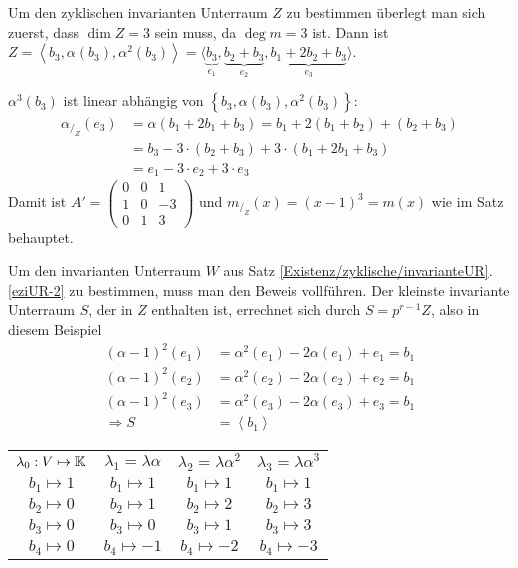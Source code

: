 Um den zyklischen invarianten Unterraum $Z$ zu bestimmen überlegt man sich zuerst, dass $\dim Z = 3$ sein muss, da $\deg m = 3$ ist.
Dann ist $Z = \left\langle b_3, \alpha(b_3), \alpha^2(b_3) \right\rangle = \langle \underbrace{b_3}_{e_1},\underbrace{b_2+b_3}_{e_2},\underbrace{b_1+2b_2+b_3}_{e_3} \rangle $.

$\alpha^3(b_3)$ ist linear abhängig von $\left\{ b_3,\alpha(b_3),\alpha^2(b_3) \right\}$:
\begin{align*}
    \alpha_{/_Z}(e_3) & = \alpha(b_1 + 2b_1 + b_3)= b_1 + 2(b_1 + b_2)+(b_2 + b_3)\\
    & = b_3 - 3\cdot(b_2 + b_3) + 3\cdot(b_1 + 2b_1 + b_3)\\
    & = e_1 - 3\cdot e_2 + 3\cdot e_3
\end{align*}
Damit ist
$A' =
\begin{pmatrix}
    0 & 0 & 1\\
    1 & 0 & -3\\
    0 & 1 & 3
\end{pmatrix} $ und $m_{/_Z}(x) = (x-1)^3 = m(x)$  wie im Satz behauptet.\par \medskip
Um den invarianten Unterraum $W$ aus Satz \ref{Existenz/zyklische/invarianteUR}.\ref{eziUR-2} zu bestimmen, muss man den Beweis vollführen.
Der kleinste invariante Unterraum $S$, der in $Z$ enthalten ist, errechnet sich durch $S = p^{r-1}Z$, also in diesem Beispiel
\begin{align*}
    (\alpha-1)^2 (e_1) & = \alpha^2 (e_1) - 2\alpha (e_1) + e_1 = b_1\\
    (\alpha-1)^2 (e_2) & = \alpha^2 (e_2) - 2\alpha (e_2) + e_2 = b_1\\
    (\alpha-1)^2 (e_3) & = \alpha^2 (e_3) - 2\alpha (e_3) + e_3 = b_1\\
    \Rightarrow S & = \left\langle b_1 \right\rangle
\end{align*}
\begin{center}
    \begin{tabular}{cccc}
        $\lambda_0 : V \mapsto \mathbb{K}$ & $\lambda_1 = \lambda \alpha$ & $\lambda_2 = \lambda \alpha^2$ & $\lambda_3 = \lambda \alpha^3$ \\
        $b_1 \mapsto 1$ & $b_1 \mapsto 1$ & $b_1 \mapsto 1$ & $b_1 \mapsto 1 $ \\
        $b_2 \mapsto 0$ & $b_2 \mapsto 1$ & $b_2 \mapsto 2$ & $b_2 \mapsto 3 $ \\
        $b_3 \mapsto 0$ & $b_3 \mapsto 0$ & $b_3 \mapsto 1$ & $b_3 \mapsto 3 $ \\
        $b_4 \mapsto 0$ & $b_4 \mapsto -1$ & $b_4 \mapsto -2$ & $b_4\mapsto -3$ \\
    \end{tabular}
\end{center}
